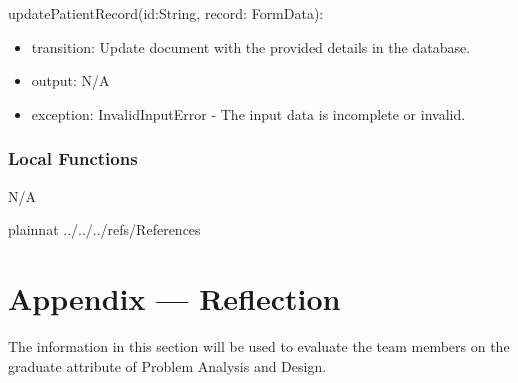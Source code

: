 \documentclass[12pt, titlepage]{article}
\begin{document}
\noindent updatePatientRecord(id:String, record: FormData):
\begin{itemize}
\item transition: Update document with the provided details in the database.
\item output: N/A
\item exception: InvalidInputError - The input data is incomplete or invalid.
\end{itemize}

\subsubsection{Local Functions}

N/A

\newpage


 {plainnat}
 {../../../refs/References}




\newpage{}

\section*{Appendix --- Reflection}


The information in this section will be used to evaluate the team members on the
graduate attribute of Problem Analysis and Design.


\end{document}
